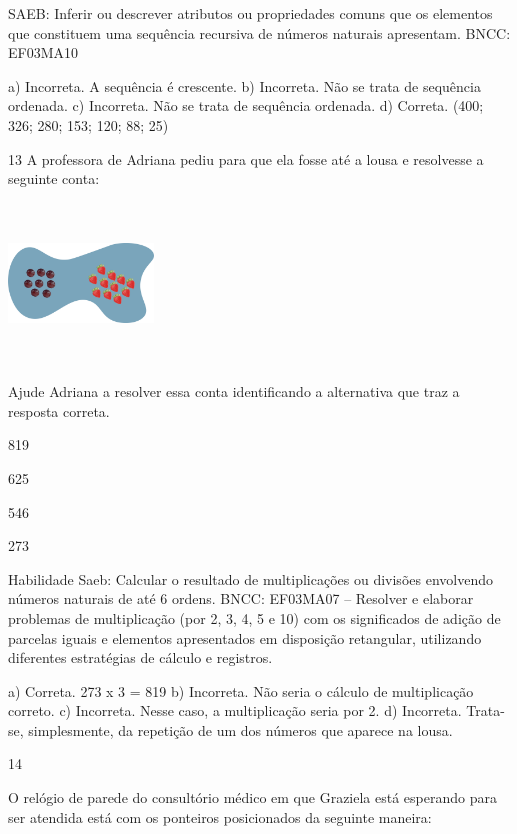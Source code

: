 {\begin{escolha}
{SAEB: Inferir ou descrever atributos ou propriedades comuns
que os elementos que constituem uma sequência recursiva de números
naturais apresentam.
BNCC: EF03MA10

a) Incorreta. A sequência é crescente.
b) Incorreta. Não se trata de sequência ordenada.
c) Incorreta. Não se trata de sequência ordenada.
d) Correta. (400; 326; 280; 153; 120; 88; 25)

\num{13} A professora de Adriana pediu para que ela fosse até a lousa e resolvesse a seguinte conta:


\includegraphics[width=1.51680in,height=1.67515in]{media/image114.png}

Ajude Adriana a resolver essa conta identificando a alternativa que traz a resposta correta.

\begin{escolha}
\item
  819
\item
  625
\item
  546
\item
  273
\end{escolha}

Habilidade Saeb: Calcular o resultado de multiplicações ou divisões
envolvendo números naturais de até 6 ordens.
BNCC: EF03MA07 – Resolver e elaborar problemas de multiplicação (por 2, 3, 4, 5 e 10) com os
significados de adição de parcelas iguais e elementos apresentados em disposição retangular,
utilizando diferentes estratégias de cálculo e registros.


a) Correta. 273 x 3 = 819
b) Incorreta. Não seria o cálculo de multiplicação correto.
c) Incorreta. Nesse caso, a multiplicação seria por 2.
d) Incorreta. Trata-se, simplesmente, da repetição de um dos números que aparece na lousa.

\num{14}

O relógio de parede do consultório médico em que Graziela está esperando
para ser atendida está com os ponteiros posicionados da seguinte maneira:

}
\end{escolha}}
